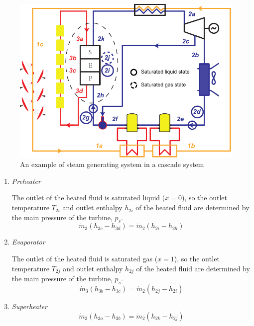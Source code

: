 \noindent \begin{figure}[htbp]
\begin{center}
	\includegraphics[width = 0.8\columnwidth]{fig/PES}
	\caption{An example of steam generating system in a cascade system}
	\label{fig:PES}
\end{center}
\end{figure}

\begin{enumerate}
  \item \emph{Preheater}
  
  The outlet of the heated fluid is saturated liquid ($x = 0$), so the outlet temperature $T_{2i}$ and outlet enthalpy $h_{2i}$ of the heated fluid are determined by the main pressure of the turbine, $p_s$.
  \begin{equation}
  \dot{m}_3 (h_{3c}-h_{3d})=\dot{m}_2 (h_{2i} - h_{2h})
\end{equation}

  \item \emph{Evaporator}
  
  The outlet of the heated fluid is saturated gas ($x = 1$), so the outlet temperature $T_{2j}$ and outlet enthalpy $h_{2j}$ of the heated fluid are determined by the main pressure of the turbine, $p_s$.
  \begin{equation}
  \dot{m}_3 (h_{3b}-h_{3c})=\dot{m}_2 (h_{2j} - h_{2i})
\end{equation}
  
  \item \emph{Superheater}
  \begin{equation}
  \dot{m}_3 (h_{3a}-h_{3b})=\dot{m}_2 (h_{2k} - h_{2j})
\end{equation}
  
\end{enumerate}

